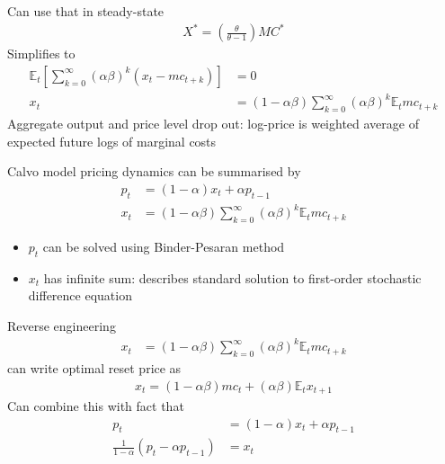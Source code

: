 \documentclass{beamer}
\begin{document}
\begin{frame}
  Can use that in steady-state 
  \begin{align}
    X^* = \left( \frac{\theta}{\theta-1}\right ) MC^*
  \end{align}
  Simplifies to
  \begin{align}
    \mathbb{E}_t \left[ \sum_{k=0}^{\infty} (\alpha \beta)^k (x_t - mc_{t+k}) \right] &=0 \\ \nonumber  
    x_t &= (1-\alpha \beta) \sum_{k=0}^{\infty} (\alpha \beta)^k \mathbb{E}_t mc_{t+k}
  \end{align}
  Aggregate output and price level drop out: log-price is weighted average of expected future logs  of marginal costs
\end{frame}

\begin{frame}
  Calvo model pricing dynamics can be summarised by
  \begin{align*}
    p_t&=(1-\alpha)x_t+\alpha p_{t-1} \\
    x_t &= (1-\alpha \beta) \sum_{k=0}^{\infty} (\alpha \beta)^k \mathbb{E}_t mc_{t+k}
  \end{align*}
  \begin{itemize}
    \item $p_t$ can be solved using Binder-Pesaran method
    \item $x_t$ has infinite sum: describes standard solution to first-order stochastic difference equation
  \end{itemize}
\end{frame}


\begin{frame}
  Reverse engineering 
  \begin{align}
    x_t &= (1-\alpha \beta) \sum_{k=0}^{\infty} (\alpha \beta)^k \mathbb{E}_t mc_{t+k}
  \end{align}
  can write optimal reset price as
  \begin{align}
  x_t=(1-\alpha \beta) mc_t + (\alpha \beta) \mathbb{E}_t x_{t+1}
 \end{align}
 Can combine this with fact that 
\begin{align}
  p_t &= (1-\alpha)x_t+\alpha p_{t-1}\\ \nonumber
  \frac{1}{1-\alpha}(p_t-\alpha p_{t-1}) &= x_t 
\end{align}
\end{frame}
\end{document}
